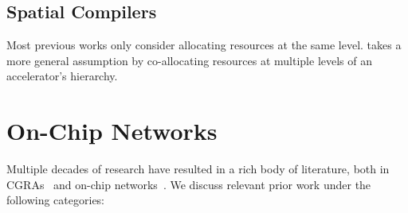 \subsection{Spatial Compilers}
Most previous works \cite{nowatzki, spatial-computation} only consider allocating resources at the same level. 
\name{} takes a more general assumption by co-allocating resources at multiple levels of an accelerator's hierarchy.


\section{On-Chip Networks}

Multiple decades of research have resulted in a rich body of literature, both in CGRAs~\cite{cgraSurvey1, cgraSurvey2} and on-chip networks~\cite{ocn-synthesis}. We discuss relevant prior work under the following categories:

